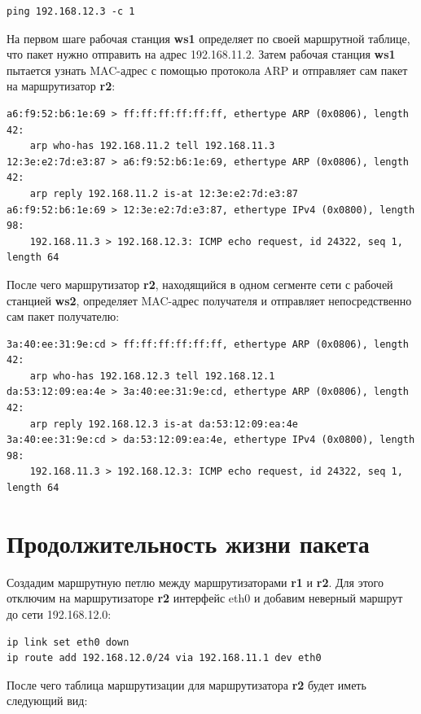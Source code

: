 \documentclass[a4paper,12pt]{article}
\begin{document}
\begin{Verbatim}
ping 192.168.12.3 -c 1
\end{Verbatim}

На первом шаге рабочая станция \textbf{ws1} определяет по своей маршрутной таблице, что
пакет нужно отправить на адрес 192.168.11.2. Затем рабочая станция \textbf{ws1} пытается
узнать MAC-адрес с помощью протокола ARP и отправляет сам пакет на маршрутизатор
\textbf{r2}:

\begin{Verbatim}
a6:f9:52:b6:1e:69 > ff:ff:ff:ff:ff:ff, ethertype ARP (0x0806), length 42:
    arp who-has 192.168.11.2 tell 192.168.11.3
12:3e:e2:7d:e3:87 > a6:f9:52:b6:1e:69, ethertype ARP (0x0806), length 42:
    arp reply 192.168.11.2 is-at 12:3e:e2:7d:e3:87
a6:f9:52:b6:1e:69 > 12:3e:e2:7d:e3:87, ethertype IPv4 (0x0800), length 98:
    192.168.11.3 > 192.168.12.3: ICMP echo request, id 24322, seq 1, length 64
\end{Verbatim}

После чего маршрутизатор \textbf{r2}, находящийся в одном сегменте сети с рабочей
станцией \textbf{ws2}, определяет MAC-адрес получателя и отправляет непосредственно
сам пакет получателю:

\begin{Verbatim}
3a:40:ee:31:9e:cd > ff:ff:ff:ff:ff:ff, ethertype ARP (0x0806), length 42: 
    arp who-has 192.168.12.3 tell 192.168.12.1
da:53:12:09:ea:4e > 3a:40:ee:31:9e:cd, ethertype ARP (0x0806), length 42:
    arp reply 192.168.12.3 is-at da:53:12:09:ea:4e
3a:40:ee:31:9e:cd > da:53:12:09:ea:4e, ethertype IPv4 (0x0800), length 98:
    192.168.11.3 > 192.168.12.3: ICMP echo request, id 24322, seq 1, length 64
\end{Verbatim}

\section{Продолжительность жизни пакета}

Создадим маршрутную петлю между маршрутизаторами \textbf{r1} и \textbf{r2}. Для этого
отключим на маршрутизаторе \textbf{r2} интерфейс eth0 и добавим неверный маршрут 
до сети 192.168.12.0:

\begin{Verbatim}
ip link set eth0 down
ip route add 192.168.12.0/24 via 192.168.11.1 dev eth0
\end{Verbatim}

После чего таблица маршрутизации для маршрутизатора \textbf{r2} будет иметь следующий вид:
\end{document}
